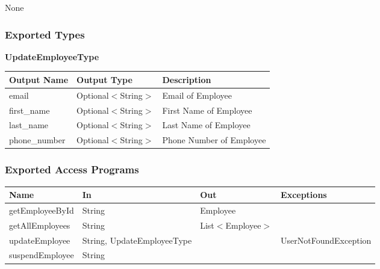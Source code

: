 \documentclass[12pt, titlepage]{article}
\begin{document}
None

\subsubsection{Exported Types}

\textbf{UpdateEmployeeType}

\begin{table}[H]
	\begin{tabular}{|p{}|p{}|p{}|}
		\hline
		\textbf{Output Name} & \textbf{Output Type} & \textbf{Description}     \\
		\hline
		email                & Optional$<$String$>$ & Email of Employee        \\
		\hline
		first\_name          & Optional$<$String$>$ & First Name of Employee   \\
		\hline
		last\_name           & Optional$<$String$>$ & Last Name of Employee    \\
		\hline
		phone\_number        & Optional$<$String$>$ & Phone Number of Employee \\
		\hline
	\end{tabular}
\end{table}

\subsubsection{Exported Access Programs}

\begin{center}
	\begin{adjustbox}{width=\textwidth}
		\begin{tabular}{llll}
			\hline
			\textbf{Name}   & \textbf{In}                & \textbf{Out}       & \textbf{Exceptions}   \\
			\hline
			getEmployeeById & String                     & Employee           & ~                     \\
			getAllEmployees & String                     & List$<$Employee$>$ & ~                     \\
			updateEmployee  & String, UpdateEmployeeType & ~                  & UserNotFoundException \\
			suspendEmployee & String                     & ~                  & ~                     \\
			\hline
		\end{tabular}
	\end{adjustbox}
\end{center}
\end{document}
